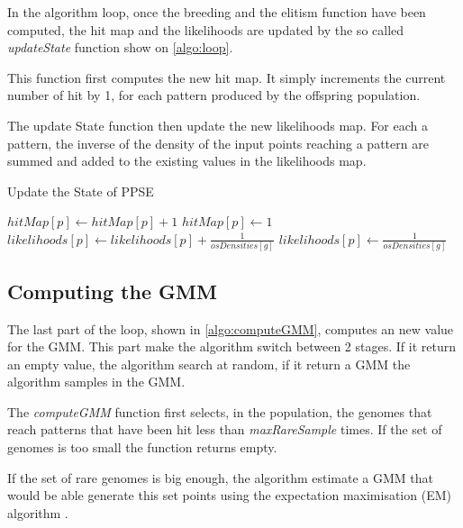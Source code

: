 \documentclass[10pt,letterpaper]{article}
\theoremstyle{definition}
\theoremstyle{remark}
\begin{document}
In the algorithm loop, once the breeding and the elitism function have been computed, the hit map and the likelihoods are updated by the so called \textit{updateState} function show on \ref{algo:loop}. 

This function first computes the new hit map. It simply increments the current number of hit by 1, for each pattern produced by the offspring population.

The update State function then update the new likelihoods map. For each a pattern, the inverse of the density of the input points reaching a pattern are summed and added to the existing values in the likelihoods map.

\begin{algorithm}
    \caption{Update the State of PPSE}
    \label{algo:loop}
    \begin{algorithmic}[1]
          \State $hitMap[p] \gets hitMap[p] + 1$
          \Else
          \State $hitMap[p] \gets 1$
          \EndIf
          \Statex          
          \State $likelihoods[p] \gets likelihoods[p] + \frac{1}{osDensities[g]}$
          \Else 
          \State $likelihoods[p] \gets \frac{1}{osDensities[g]}$
          \EndIf
        \EndFor
        \State {}
    \EndFunction

    \end{algorithmic}
\end{algorithm}

\subsection*{Computing the GMM}\label{sec:computeGMM}

The last part of the loop, shown in \ref{algo:computeGMM}, computes an new value for the GMM. This part make the algorithm switch between 2 stages. If it return an empty value, the algorithm search at random, if it return a GMM the algorithm samples in the GMM.

The \textit{computeGMM} function first selects, in the population, the genomes that reach patterns that have been hit less than \textit{maxRareSample} times. If the set of genomes is too small the function returns empty.

If the set of rare genomes is big enough, the algorithm estimate a GMM that would be able generate this set points using the expectation maximisation (EM) algorithm \cite{dempster1977em}. 
\end{document}
